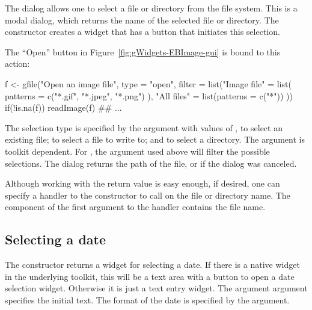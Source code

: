 The  dialog allows one to select a file or directory
from the file system. This is a modal dialog, which returns the name
of the selected file or directory. The 
constructor creates a widget that has a button that
initiates this selection.  

The ``Open'' button in Figure~\ref{fig:gWidgets-EBImage-gui} is bound
to this action:


\begin{Schunk}
\begin{Sinput}
 f <- gfile("Open an image file",
            type = "open",
            filter = list("Image file" = list(
                          patterns = c("*.gif", "*.jpeg", "*.png")
                          ),
              "All files"  =  list(patterns = c("*"))
              ))
 if(!is.na(f)) 
   readImage(f) ## ...
\end{Sinput}
\end{Schunk}


The selection type is specified by the  argument with
values of , to select an existing file;  to
select a file to write to; and  to select a
directory. The  argument is toolkit
dependent. For , the  argument
used above will filter the possible selections. The dialog returns
the path of the file, or  if the dialog was canceled.

Although working with the return value is easy enough, if desired, one can specify a
handler to the constructor to call on the file or directory name. The
component  of the first argument to the handler contains
the file name.




\subsection{Selecting a date}
\label{sec:gWidgets-selecting-date}

The  constructor returns a widget for selecting
a date. If there is a native widget in the underlying toolkit, this
will be a text area with a button to open a date selection
widget. Otherwise it is just a text entry widget.  The argument
 argument specifies the initial text. The
format of the date is specified by the 
argument.

